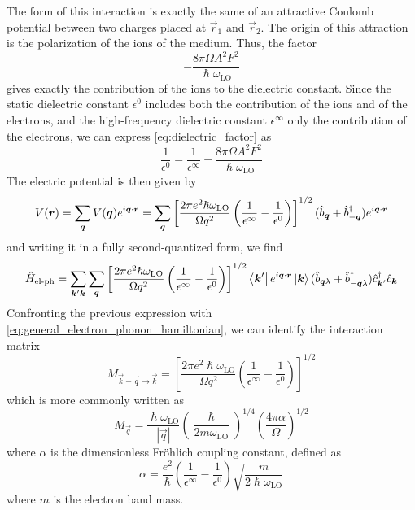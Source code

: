 The form of this interaction is exactly the same of an attractive Coulomb potential between two charges placed at $\vec{r}_1$ and $\vec{r}_2$. The origin of this attraction is the polarization of the ions of the medium. Thus, the factor
\begin{equation} \label{eq:dielectric_factor}
    - \frac{8\pi \Omega A^2 F^2}{\hslash \omega_\text{LO}}
\end{equation}
gives exactly the contribution of the ions to the dielectric constant. Since the static dielectric constant $\epsilon^0$ includes both the contribution of the ions and of the electrons, and the high-frequency dielectric constant $\epsilon^\infty$ only the contribution of the electrons, we can express \cref{eq:dielectric_factor} as
\begin{equation}
    \frac{1}{\epsilon^0} = \frac{1}{\epsilon^\infty} - \frac{8\pi \Omega A^2 F^2}{\hslash \omega_\text{LO}}
\end{equation}
The electric potential is then given by
\begin{equation}
    V(\mathbf{\boldsymbol{r}}) = \sum_{\mathbf{\boldsymbol{q}}} V(\mathbf{\boldsymbol{q}}) e^{i\mathbf{\boldsymbol{q}} \cdot \mathbf{\boldsymbol{r}}}
    =  \sum_{\mathbf{\boldsymbol{q}}} \left[ \frac{2\pi e^2 \hslash \omega_\text{LO}}{\Omega q^2} \left( \frac{1}{\epsilon^\infty} - \frac{1}{\epsilon^0} \right) \right]^{1/2} (\hat{b}_{\mathbf{\boldsymbol{q}}} + \hat{b}^\dagger_{-\mathbf{\boldsymbol{q}}}) e^{i\mathbf{\boldsymbol{q}}\cdot\mathbf{\boldsymbol{r}}}
\end{equation}
and writing it in a fully second-quantized form, we find
\begin{equation}
    \hat{H}_\text{el-ph} =  \sum_{\mathbf{\boldsymbol{k}}'\mathbf{\boldsymbol{k}}} \sum_{\mathbf{\boldsymbol{q}}} \left[ \frac{2\pi e^2 \hslash \omega_\text{LO}}{\Omega q^2} \left( \frac{1}{\epsilon^\infty} - \frac{1}{\epsilon^0} \right) \right]^{1/2} \bra{\mathbf{\boldsymbol{k}}'}e^{i\mathbf{\boldsymbol{q}}\cdot\mathbf{\boldsymbol{r}}}\ket{\mathbf{\boldsymbol{k}}}(\hat{b}_{\mathbf{\boldsymbol{q}}\lambda} + \hat{b}^\dagger_{-\mathbf{\boldsymbol{q}}\lambda}) \hat{c}^\dagger_{\mathbf{\boldsymbol{k}}'}\hat{c}_{\mathbf{\boldsymbol{k}}}
\end{equation}
Confronting the previous expression with \cref{eq:general_electron_phonon_hamiltonian}, we can identify the interaction matrix
\begin{equation}
    M_{\vec{k}-\vec{q} \rightarrow \vec{k}} =  \left[ \frac{2\pi e^2 \hslash \omega_\text{LO}}{\Omega q^2} \left( \frac{1}{\epsilon^\infty} - \frac{1}{\epsilon^0} \right) \right]^{1/2}
\end{equation}
which is more commonly written as
\begin{equation} \label{eq:frohlich_matrix}
    M_\vec{q} =  \frac{\hslash \omega_\text{LO}}{|\vec{q}|} \left(\frac{\hslash}{2m\omega_\text{LO}}\right)^{1/4} \left(\frac{4\pi\alpha}{\Omega}\right)^{1/2}
\end{equation}
where $\alpha$ is the dimensionless Fröhlich coupling constant,  defined as
\begin{equation}
    \alpha = \frac{e^2}{\hslash} \left( \frac{1}{\epsilon^\infty} - \frac{1}{\epsilon^0} \right) \sqrt{\frac{m}{2\hslash\omega_\text{LO}}}
\end{equation}
where $m$ is the electron band mass.

